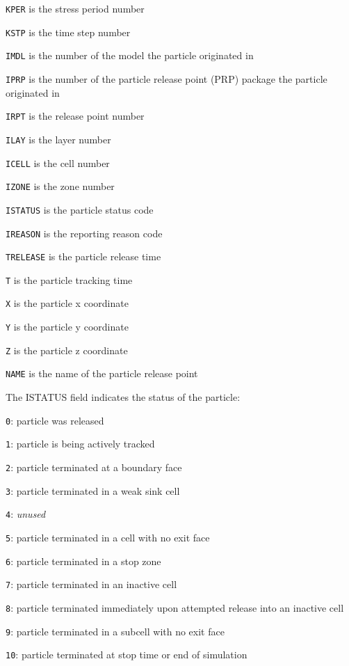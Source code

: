 \begin{description} \itemsep0pt \parskip0pt 
\item \texttt{KPER} is the stress period number
\item \texttt{KSTP} is the time step number
\item \texttt{IMDL} is the number of the model the particle originated in
\item \texttt{IPRP} is the number of the particle release point (PRP) package the particle originated in
\item \texttt{IRPT} is the release point number
\item \texttt{ILAY} is the layer number
\item \texttt{ICELL} is the cell number
\item \texttt{IZONE} is the zone number
\item \texttt{ISTATUS} is the particle status code
\item \texttt{IREASON} is the reporting reason code
\item \texttt{TRELEASE} is the particle release time
\item \texttt{T} is the particle tracking time
\item \texttt{X} is the particle x coordinate
\item \texttt{Y} is the particle y coordinate
\item \texttt{Z} is the particle z coordinate
\item \texttt{NAME} is the name of the particle release point
\end{description}

The ISTATUS field indicates the status of the particle:

\begin{description} \itemsep0pt \parskip0pt 
\item \texttt{0}: particle was released
\item \texttt{1}: particle is being actively tracked
\item \texttt{2}: particle terminated at a boundary face
\item \texttt{3}: particle terminated in a weak sink cell
\item \texttt{4}: \textit{unused}
\item \texttt{5}: particle terminated in a cell with no exit face
\item \texttt{6}: particle terminated in a stop zone
\item \texttt{7}: particle terminated in an inactive cell
\item \texttt{8}: particle terminated immediately upon attempted release into an inactive cell
\item \texttt{9}: particle terminated in a subcell with no exit face
\item \texttt{10}: particle terminated at stop time or end of simulation
\end{description}

